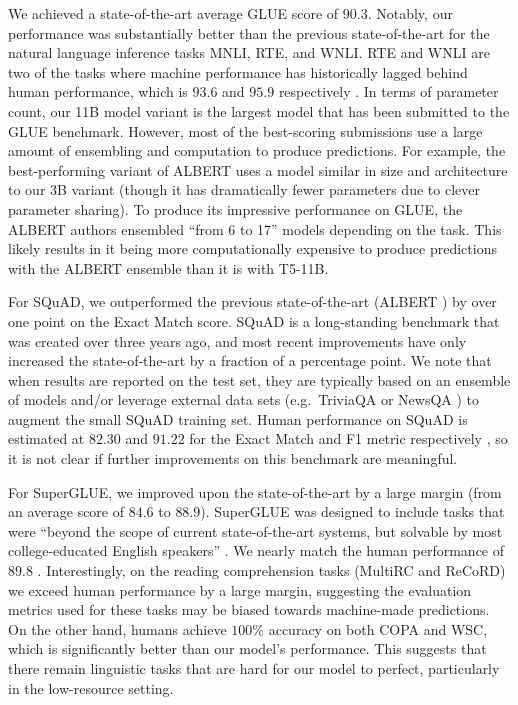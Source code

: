 \documentclass[twoside,11pt]{article}
\begin{document}
We achieved a state-of-the-art average GLUE score of $90.3$.
Notably, our performance was substantially better than the previous state-of-the-art for the natural language inference tasks MNLI, RTE, and WNLI.
RTE and WNLI are two of the tasks where machine performance has historically lagged behind human performance, which is $93.6$ and $95.9$ respectively \citep{wang2018glue}.
In terms of parameter count, our 11B model variant is the largest model that has been submitted to the GLUE benchmark.
However, most of the best-scoring submissions use a large amount of ensembling and computation to produce predictions.
For example, the best-performing variant of ALBERT \citep{lan2019albert} uses a model similar in size and architecture to our 3B variant (though it has dramatically fewer parameters due to clever parameter sharing).
To produce its impressive performance on GLUE, the ALBERT authors ensembled ``from 6 to 17'' models depending on the task.
This likely results in it being more computationally expensive to produce predictions with the ALBERT ensemble than it is with T5-11B.

For SQuAD, we outperformed the previous state-of-the-art (ALBERT \citep{lan2019albert}) by over one point on the Exact Match score.
SQuAD is a long-standing benchmark that was created over three years ago, and most recent improvements have only increased the state-of-the-art by a fraction of a percentage point.
We note that when results are reported on the test set, they are typically based on an ensemble of models and/or leverage external data sets (e.g.\ TriviaQA \citep{joshi2017triviaqa} or NewsQA \citep{trischler2016newsqa}) to augment the small SQuAD training set.
Human performance on SQuAD is estimated at $82.30$ and $91.22$ for the Exact Match and F1 metric respectively \citep{rajpurkar2016squad}, so it is not clear if further improvements on this benchmark are meaningful.

For SuperGLUE, we improved upon the state-of-the-art by a large margin (from an average score of $84.6$ \citep{liu2019roberta} to $88.9$).
SuperGLUE was designed to include tasks that were ``beyond the scope of current state-of-the-art systems, but solvable by most college-educated English speakers'' \citep{wang2019superglue}.
We nearly match the human performance of $89.8$ \citep{wang2019superglue}.
Interestingly, on the reading comprehension tasks (MultiRC and ReCoRD) we exceed human performance by a large margin, suggesting the evaluation metrics used for these tasks may be biased towards machine-made predictions.
On the other hand, humans achieve $100\%$ accuracy on both COPA and WSC, which is significantly better than our model's performance.
This suggests that there remain linguistic tasks that are hard for our model to perfect, particularly in the low-resource setting.
\end{document}
